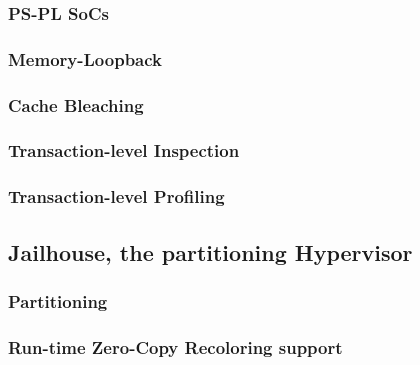 \subsubsection{PS-PL SoCs}
\subsubsection{Memory-Loopback}
\subsubsection{Cache Bleaching}
\subsubsection{Transaction-level Inspection}
\subsubsection{Transaction-level Profiling}

\subsection{Jailhouse, the partitioning Hypervisor}
\subsubsection{Partitioning}
        \subsubsection{Run-time Zero-Copy Recoloring support}
